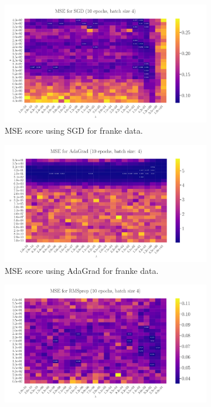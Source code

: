 \documentclass[%
reprint,s
amsmath,amssymb,
aps,
]{revtex4-2}
\begin{document}
\begin{figure}
	\begin{subfigure}{0.41\textwidth}
		\includegraphics[width=\textwidth]{Figures/LinRegSGD_25x25_epoch10_batchS4.pdf}
		\caption{MSE score using SGD for franke data.}
		\label{fig:LinReg25x25_epoch10_bacthS50}
	\end{subfigure}
	\hfill
	\begin{subfigure}{0.41\textwidth}
		\includegraphics[width=\textwidth]{Figures/LinRegAdaGrad_25x25_epoch10_batchS4.pdf}
		\caption{MSE score using AdaGrad for franke data.}
		\label{fig:LinReg25x25_epoch10_bacthS50_zoomed}
	\end{subfigure}
\hfill\newline
	\begin{subfigure}{0.41\textwidth}
		\includegraphics[width=\textwidth]{Figures/LinRegRMSprop_25x25_epoch10_batchS4.pdf}

\end{subfigure}
\end{figure}
\end{document}
